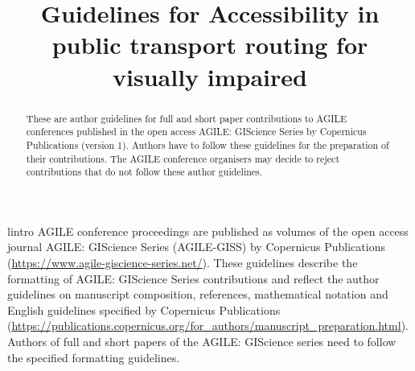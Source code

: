 \documentclass[agile, final]{copernicus-agile}
\begin{document}
\title{Guidelines for Accessibility in public transport routing for visually impaired}









\maketitle

\begin{abstract}
These are author guidelines for full and short paper contributions to AGILE conferences published in the open access AGILE: GIScience Series by Copernicus Publications (version 1). Authors have to follow these guidelines for the preparation of their contributions. The AGILE conference organisers may decide to reject contributions that do not follow these author guidelines.
\end{abstract}


\labe l{intro}
AGILE conference proceedings are published as volumes of the open access journal AGILE: GIScience Series (AGILE-GISS) by Copernicus Publications (\url{https://www.agile-giscience-series.net/}). These guidelines describe the formatting of AGILE: GIScience Series contributions and reflect the author guidelines on manuscript composition, references, mathematical notation and English guidelines specified by Copernicus Publications (\url{https://publications.copernicus.org/for_authors/manuscript_preparation.html}). Authors of full and short papers of the AGILE: GIScience series need to follow the specified formatting guidelines.
\end{document}
